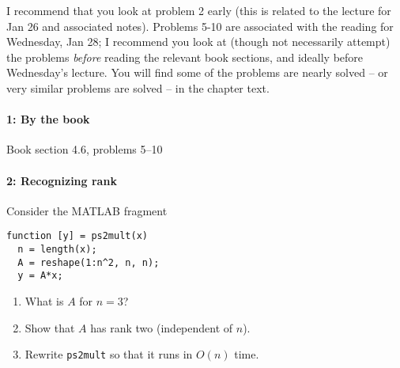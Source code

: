 \documentclass[12pt, leqno]{article}
\begin{document}

I recommend that you look at problem 2 early (this is related to the
lecture for Jan 26 and associated notes).  Problems 5-10 are
associated with the reading for Wednesday, Jan 28; I recommend you
look at (though not necessarily attempt) the problems {\em before}
reading the relevant book sections, and ideally before Wednesday's
lecture.  You will find some of the problems are nearly solved -- or
very similar problems are solved -- in the chapter text.

\paragraph*{1: By the book}
Book section 4.6, problems 5--10

\paragraph*{2: Recognizing rank}
Consider the MATLAB fragment

\lstset{language=matlab,frame=lines,columns=flexible}
\begin{lstlisting}
function [y] = ps2mult(x)
  n = length(x);
  A = reshape(1:n^2, n, n);
  y = A*x;
\end{lstlisting}

\begin{enumerate}
\item What is $A$ for $n = 3$?
\item Show that $A$ has rank two (independent of $n$).
\item Rewrite {\tt ps2mult} so that it runs in $O(n)$ time.
\end{enumerate}
\end{document}
